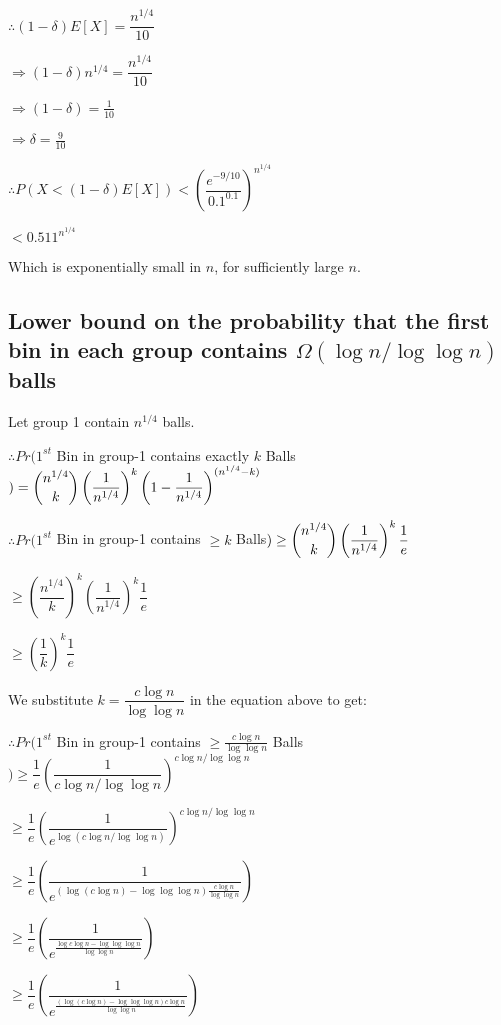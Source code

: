 \documentclass{article}
\begin{document}
$\therefore (1-\delta)E[X] = \dfrac{n^{1/4}}{10}$

$\Rightarrow (1-\delta)n^{1/4} = \dfrac{n^{1/4}}{10}$

$\Rightarrow (1-\delta) = \frac{1}{10}$

$\Rightarrow \delta = \frac{9}{10}$

$\therefore P(X < (1-\delta)E[X]) < \left(\dfrac{e^{-9/10}}{0.1^{0.1}}\right)^{n^{1/4}}$

$< 0.511^{n^{1/4}}$

Which is exponentially small in $n$, for sufficiently large $n$.


\subsection{Lower bound on the probability that the first bin in each group contains $\Omega(\log{n}/\log{\log{n}})$ balls}

Let group 1 contain $n^{1/4}$ balls.

$\therefore Pr(1^{st}$ Bin in group-1 contains exactly $k$ Balls$) = \dbinom{n^{1/4}}{k} \left( \dfrac{1}{n^{1/4}} \right)^{k} \left( 1 - \dfrac{1}{n^{1/4}} \right)^{(n^{1/4} - k)}$

$\therefore Pr(1^{st}$ Bin in group-1 contains $\ge k$ Balls$) \ge \dbinom{n^{1/4}}{k} \left( \dfrac{1}{n^{1/4}} \right)^{k} \dfrac{1}{e}$

$\ge \left(\dfrac{n^{1/4}}{k}\right)^{k} \left( \dfrac{1}{n^{1/4}} \right)^{k} \dfrac{1}{e}$

$\ge \left(\dfrac{1}{k}\right)^{k} \dfrac{1}{e}$

We substitute $k = \dfrac{c\log{n}}{\log{\log{n}}}$ in the equation above to get:

$\therefore Pr(1^{st}$ Bin in group-1 contains $\ge \frac{c\log{n}}{\log{\log{n}}}$ Balls$) \ge \dfrac{1}{e} \left(\dfrac{1}{c\log{n}/\log{\log{n}}}\right)^{c\log{n}/\log{\log{n}}}$

$\ge \dfrac{1}{e} \left(\dfrac{1}{{e}^{\log{(c\log{n}/\log{\log{n}})}}}\right)^{c\log{n}/\log{\log{n}}}$

$\ge \dfrac{1}{e} \left(\dfrac{1}{{e}^{(\log{(c\log{n})} - \log{\log{\log{n}}})\frac{c\log{n}}{\log{\log{n}}}}} \right)$

$\ge \dfrac{1}{e} \left(\dfrac{1}{{e}^{\frac{\log{c\log{n}} - \log{\log{\log{n}}}}{\log{\log{n}}}}} \right)$

$\ge \dfrac{1}{e} \left(\dfrac{1}{{e}^{\frac{(\log{(c\log{n})} - \log{\log{\log{n}}})c\log{n}}{\log{\log{n}}}}} \right)$ 
\end{document}
